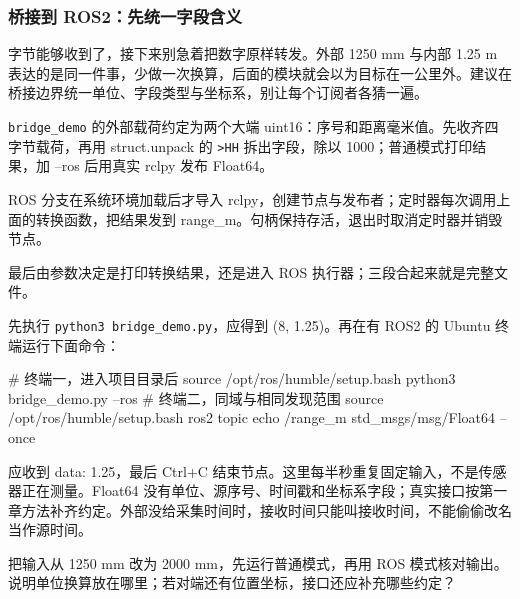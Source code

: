 \subsubsection{桥接到 ROS2：先统一字段含义}
字节能够收到了，接下来别急着把数字原样转发。外部 1250 mm 与内部 1.25 m 表达的是同一件事，少做一次换算，后面的模块就会以为目标在一公里外。建议在桥接边界统一单位、字段类型与坐标系，别让每个订阅者各猜一遍。
\begin{example}[把毫米数据发布为米]
\texttt{bridge\_demo} 的外部载荷约定为两个大端 uint16：序号和距离毫米值。先收齐四字节载荷，再用 struct.unpack 的 \texttt{>HH} 拆出字段，除以 1000；普通模式打印结果，加 --ros 后用真实 rclpy 发布 Float64。
\begin{commcode}

\end{commcode}
ROS 分支在系统环境加载后才导入 rclpy，创建节点与发布者；定时器每次调用上面的转换函数，把结果发到 range\_m。句柄保持存活，退出时取消定时器并销毁节点。
\begin{commcode}

\end{commcode}
最后由参数决定是打印转换结果，还是进入 ROS 执行器；三段合起来就是完整文件。
\begin{commcode}

\end{commcode}
先执行 \texttt{python3 bridge\_demo.py}，应得到 (8, 1.25)。再在有 ROS2 的 Ubuntu 终端运行下面命令：
\begin{commcode}
\begin{tbash}
# 终端一，进入项目目录后
source /opt/ros/humble/setup.bash
python3 bridge_demo.py --ros
# 终端二，同域与相同发现范围
source /opt/ros/humble/setup.bash
ros2 topic echo /range_m std_msgs/msg/Float64 --once
\end{tbash}
\end{commcode}
应收到 data: 1.25，最后 Ctrl+C 结束节点。这里每半秒重复固定输入，不是传感器正在测量。Float64 没有单位、源序号、时间戳和坐标系字段；真实接口按第一章方法补齐约定。外部没给采集时间时，接收时间只能叫接收时间，不能偷偷改名当作源时间。
\end{example}
\begin{exercise}\label{ex:v2-comm-units}
把输入从 1250 mm 改为 2000 mm，先运行普通模式，再用 ROS 模式核对输出。说明单位换算放在哪里；若对端还有位置坐标，接口还应补充哪些约定？
\end{exercise}

